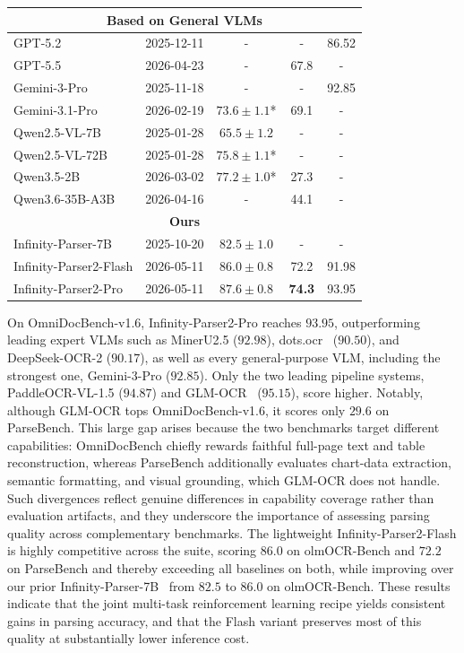 \begin{table}[htbp]
\begin{tabular}{l c c c c}
\multicolumn{5}{c}{\textbf{Based on General VLMs}} \\
\midrule
GPT-5.2 & 2025-12-11 & - & - & 86.52 \\
GPT-5.5 & 2026-04-23 & - & 67.8 & - \\
Gemini-3-Pro & 2025-11-18 & - & - & 92.85 \\
Gemini-3.1-Pro & 2026-02-19 & $73.6 \pm 1.1$* & 69.1 & - \\
Qwen2.5-VL-7B & 2025-01-28 & $65.5 \pm 1.2$ & - & - \\
Qwen2.5-VL-72B & 2025-01-28 & $75.8 \pm 1.1$* & - & - \\
Qwen3.5-2B & 2026-03-02 & $77.2 \pm 1.0$* & 27.3 & - \\
Qwen3.6-35B-A3B & 2026-04-16 & - & 44.1 & - \\
\midrule

\multicolumn{5}{c}{\textbf{Ours}} \\
\midrule
Infinity-Parser-7B & 2025-10-20 & $82.5 \pm 1.0$ & - & - \\
Infinity-Parser2-Flash & 2026-05-11 & $86.0  \pm 0.8$ & 72.2 & 91.98 \\
Infinity-Parser2-Pro & 2026-05-11 & $\mathbf{87.6 \pm 0.8}$ & \textbf{74.3} & 93.95 \\
\bottomrule
\end{tabular}
\end{table}

On OmniDocBench-v1.6, Infinity-Parser2-Pro reaches $93.95$, outperforming leading expert VLMs such as MinerU2.5 ($92.98$), dots.ocr~\cite{dotsocr2025} ($90.50$), and DeepSeek-OCR-2 ($90.17$), as well as every general-purpose VLM, including the strongest one, Gemini-3-Pro ($92.85$). Only the two leading pipeline systems, PaddleOCR-VL-1.5 ($94.87$) and GLM-OCR~\cite{zhipu2026glmocr} ($95.15$), score higher. Notably, although GLM-OCR tops OmniDocBench-v1.6, it scores only $29.6$ on ParseBench. This large gap arises because the two benchmarks target different capabilities: OmniDocBench chiefly rewards faithful full-page text and table reconstruction, whereas ParseBench additionally evaluates chart-data extraction, semantic formatting, and visual grounding, which GLM-OCR does not handle. Such divergences reflect genuine differences in capability coverage rather than evaluation artifacts, and they underscore the importance of assessing parsing quality across complementary benchmarks. The lightweight Infinity-Parser2-Flash is highly competitive across the suite, scoring $86.0$ on olmOCR-Bench and $72.2$ on ParseBench and thereby exceeding all baselines on both, while improving over our prior Infinity-Parser-7B~\cite{wang2025infinity} from $82.5$ to $86.0$ on olmOCR-Bench. These results indicate that the joint multi-task reinforcement learning recipe yields consistent gains in parsing accuracy, and that the Flash variant preserves most of this quality at substantially lower inference cost.

